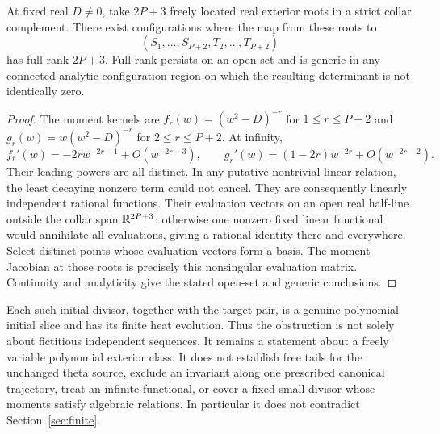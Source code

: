 \begin{proposition}
\label{prop:rank}
At fixed real $D\ne0$, take $2P+3$ freely located real exterior
roots in a strict collar complement. There exist configurations where
the map from these roots to
\[
 (S_1,\ldots,S_{P+2},T_2,\ldots,T_{P+2})
\]
has full rank $2P+3$. Full rank persists on an open set and is generic
in any connected analytic configuration region on which the resulting
determinant is not identically zero.
\end{proposition}
\begin{proof}
The moment kernels are $f_r(w)=(w^2-D)^{-r}$ for $1\le r\le P+2$
and $g_r(w)=w(w^2-D)^{-r}$ for $2\le r\le P+2$. At infinity,
\[
 f_r'(w)=-2r w^{-2r-1}+O(w^{-2r-3}),\qquad
 g_r'(w)=(1-2r)w^{-2r}+O(w^{-2r-2}).
\]
Their leading powers are all distinct. In any putative nontrivial
linear relation, the least decaying nonzero term could not cancel.
They are consequently linearly independent rational functions.
Their evaluation vectors on an open real half-line outside the collar
span $\mathbb R^{2P+3}$: otherwise one nonzero fixed linear functional
would annihilate all evaluations, giving a rational identity there
and everywhere. Select distinct points whose evaluation vectors form
a basis. The moment Jacobian at those roots is precisely this
nonsingular evaluation matrix. Continuity and analyticity give the
stated open-set and generic conclusions.
\end{proof}

Each such initial divisor, together with the target pair, is a genuine
polynomial initial slice and has its finite heat evolution. Thus the
obstruction is not solely about fictitious independent sequences.
It remains a statement about a freely variable polynomial exterior
class. It does not establish free tails for the unchanged theta
source, exclude an invariant along one prescribed canonical
trajectory, treat an infinite functional, or cover a fixed small
divisor whose moments satisfy algebraic relations. In particular it
does not contradict Section~\ref{sec:finite}.
